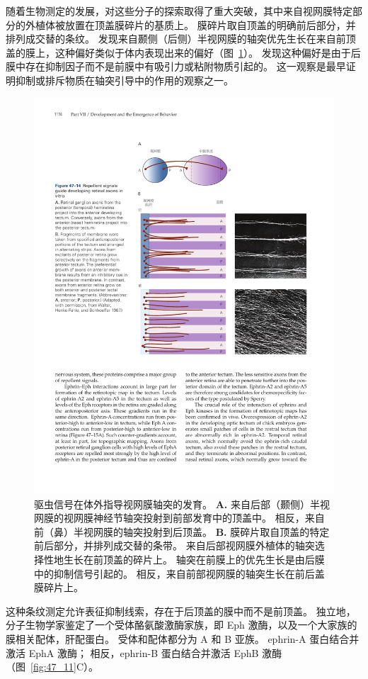 随着生物测定的发展，对这些分子的探索取得了重大突破，其中来自视网膜特定部分的外植体被放置在顶盖膜碎片的基质上。
膜碎片取自顶盖的明确前后部分，并排列成交替的条纹。 
发现来自颞侧（后侧）半视网膜的轴突优先生长在来自前顶盖的膜上，这种偏好类似于体内表现出来的偏好（图~\ref{fig:47_14}）。
发现这种偏好是由于后膜中存在抑制因子而不是前膜中有吸引力或粘附物质引起的。
这一观察是最早证明抑制或排斥物质在轴突引导中的作用的观察之一。


\begin{figure}[htbp]
	\centering
	\includegraphics[width=0.84\linewidth]{chap47/fig_47_14}
	\caption{驱虫信号在体外指导视网膜轴突的发育。
		\textbf{A.} 来自后部（颞侧）半视网膜的视网膜神经节轴突投射到前部发育中的顶盖中。
		相反，来自前（鼻）半视网膜的轴突投射到后顶盖。
		\textbf{B.} 膜碎片取自顶盖的特定前后部分，并排列成交替的条带。
		来自后部视网膜外植体的轴突选择性地生长在前顶盖的碎片上。
		轴突在前膜上的优先生长是由后膜中的抑制信号引起的。
		相反，来自前部视网膜的轴突生长在前后盖膜碎片上\cite{walter1987avoidance}。}
	\label{fig:47_14}
\end{figure}


这种条纹测定允许表征抑制线索，存在于后顶盖的膜中而不是前顶盖。
独立地，分子生物学家鉴定了一个受体酪氨酸激酶家族，即 Eph 激酶，以及一个大家族的膜相关配体，肝配蛋白。
受体和配体都分为 A 和 B 亚族。
ephrin-A 蛋白结合并激活 EphA 激酶；
相反，ephrin-B 蛋白结合并激活 EphB 激酶（图~\ref{fig:47_11}C）。


